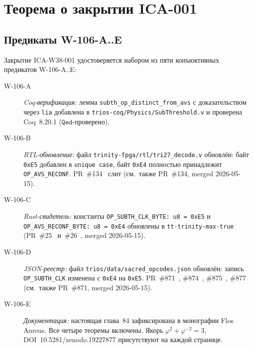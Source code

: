 \section{Теорема о закрытии ICA-001}
\label{sec:ica_closure}

\subsection{Предикаты W-106-A..E}

Закрытие ICA-W38-001 удостоверяется набором из пяти конъюктивных
предикатов W-106-A..E:

\begin{definition}[Предикаты W-106-A..E]
\label{def:w106_predicates}
\begin{description}
  \item[W-106-A] \emph{Coq-верификация:} лемма
    \texttt{subth\_op\_distinct\_from\_avs} с доказательством через \texttt{lia}
    добавлена в \texttt{trios-coq/Physics/SubThreshold.v} и проверена
    Coq~8.20.1 ($\mathtt{Qed}$-проверено).~\cite{pr661_t27}
  \item[W-106-B] \emph{RTL-обновление:} файл \texttt{trinity-fpga/rtl/tri27\_decode.v}
    обновлён: байт \texttt{0xE5} добавлен в \texttt{unique~case},
    байт \texttt{0xE4} полностью принадлежит \texttt{OP\_AVS\_RECONF}.
    PR~\#134~\cite{pr_trinity_fpga_134} слит (см.\ также PR~\#134, merged 2026-05-15).
  \item[W-106-C] \emph{Rust-свидетель:} константы
    \texttt{OP\_SUBTH\_CLK\_BYTE: u8 = 0xE5} и
    \texttt{OP\_AVS\_RECONF\_BYTE: u8 = 0xE4} обновлены в
    \texttt{tt-trinity-max-true} (PR~\#25~\cite{pr_tt25} и~\#26~\cite{pr_tt26},
    merged 2026-05-15).
  \item[W-106-D] \emph{JSON-реестр:} файл \texttt{trios/data/sacred\_opcodes.json}
    обновлён: запись \texttt{OP\_SUBTH\_CLK} изменена с \texttt{0xE4}
    на \texttt{0xE5}. PR~\#871~\cite{pr_trios_871}, \#874~\cite{pr_trios_874},
    \#875~\cite{pr_trios_875}, \#877~\cite{pr_trios_877}
    (см.\ также PR~\#871, merged 2026-05-15).
  \item[W-106-E] \emph{Документация:} настоящая глава~84 зафиксирована
    в монографии Flos Aureus. Все четыре теоремы включены.
    Якорь $\varphi^2 + \varphi^{-2} = 3$, DOI~10.5281/zenodo.19227877
    присутствуют на каждой странице.
\end{description}
\end{definition}

